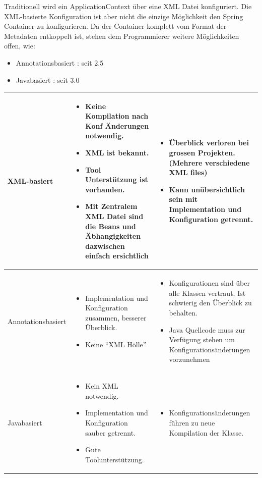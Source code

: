 \documentclass[a4paper,10pt]{scrreprt}
\begin{document}
Traditionell wird ein ApplicationContext über eine XML Datei konfiguriert. Die XML-basierte
Konfiguration ist aber nicht die einzige Möglichkeit den Spring Container zu konfigurieren. Da der
Container komplett vom Format der Metadaten entkoppelt ist, stehen dem Programmierer weitere
Möglichkeiten offen, wie:
\begin{itemize}
 \item Annotationsbasiert : seit 2.5
 \item Javabasiert : seit 3.0
\end{itemize}

\begin{tabular}{|l|p{7cm}|p{7cm}|}
\hline
XML-basiert & \begin{itemize}
               \item Keine Kompilation nach Konf Änderungen notwendig.
               \item XML ist bekannt.
               \item Tool Unterstützung ist vorhanden.
               \item Mit Zentralem XML Datei sind die Beans und Äbhangigkeiten dazwischen einfach ersichtlich
              \end{itemize} &
              \begin{itemize}
               \item Überblick verloren bei grossen Projekten. (Mehrere verschiedene XML files)
               \item Kann unübersichtlich sein mit Implementation und Konfiguration getrennt.
              \end{itemize} \\ \hline
Annotationsbasiert & \begin{itemize}
                      \item Implementation und Konfiguration zusammen, besserer Überblick.
                      \item Keine ``XML Hölle''
                     \end{itemize}&
                     \begin{itemize}
                      \item Konfigurationen sind über alle Klassen vertraut. Ist schwierig den Überblick zu behalten.
                      \item Java Quellcode muss zur Verfügung stehen um Konfigurationsänderungen vorzunehmen
                     \end{itemize} \\ \hline
Javabasiert & \begin{itemize}
               \item Kein XML notwendig.
               \item Implementation und Konfiguration sauber getrennt.
               \item Gute Toolunterstützung. 
              \end{itemize} &
              \begin{itemize}
               \item Konfigurationsänderungen führen zu neue Kompilation der Klasse.
              \end{itemize}
\end{tabular}
\end{document}
